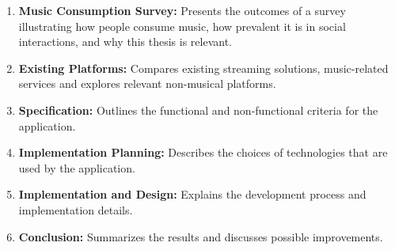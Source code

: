 \begin{enumerate}
    \item \textbf{Music Consumption Survey:}
    Presents the outcomes of a survey illustrating how people consume music,
    how prevalent it is in social interactions, and why this thesis is relevant.

    \item \textbf{Existing Platforms:}
    Compares existing streaming solutions, music-related services
    and explores relevant non-musical platforms.

    \item \textbf{Specification:}
    Outlines the functional and non-functional criteria for the application.

    \item \textbf{Implementation Planning:}
    Describes the choices of technologies that are used by the application.

    \item \textbf{Implementation and Design:}
    Explains the development process and implementation details.

    \item \textbf{Conclusion:}
    Summarizes the results and discusses possible improvements.
\end{enumerate}